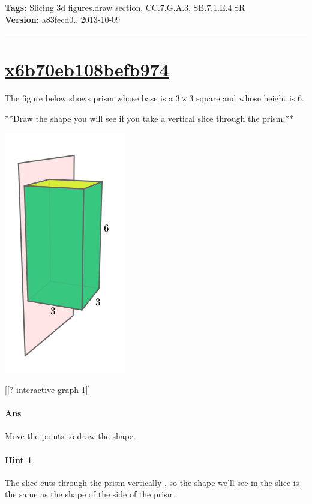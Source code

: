 \documentclass[twocolumn,10pt]{article}
\def\shrinkfactor{0.4}
\begin{document}
\medskip
\noindent
\textbf{Tags:} {\footnotesize Slicing 3d figures.draw section, CC.7.G.A.3, SB.7.1.E.4.SR}\\
\textbf{Version:} a83fecd0.. 2013-10-09
\smallskip\hrule





\section{\href{https://www.khanacademy.org/devadmin/content/items/x6b70eb108befb974}{x6b70eb108befb974}}

\noindent
The figure below shows prism whose base is a $3\times 3$ square and whose height is $6$.   

**Draw the shape you will see if you take a vertical slice through the prism.**   
\DIFaddbegin {}\DIFaddend 


\includegraphics[scale=\shrinkfactor]{figures/94bf14f4775048a20e633abd42558d8e108ecfab.png}

[[? interactive-graph 1]] 

\paragraph{Ans} Move the points to draw the shape. 

\paragraph{Hint 1}The slice cuts through the prism vertically \DIFaddbegin {}\DIFaddend , so the shape we'll see in the slice is the same as the shape of the side of the prism.
\end{document}
